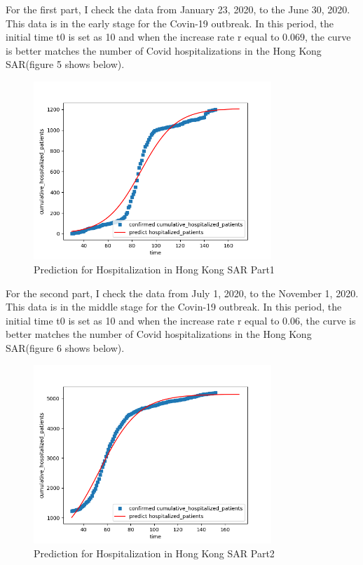 \documentclass[12pt]{article}
\begin{document}
	For the first part, I check the data from January 23, 2020, to the June 30, 2020. This data is in the early stage for the Covin-19 outbreak. In this period, the initial time t0 is set as 10 and when the increase rate r equal to 0.069, the curve is better matches the number of Covid hospitalizations in the Hong Kong SAR(figure 5 shows below).
	\clearpage
	\begin{figure}[h]
		\centering
		\includegraphics[width=0.8\textwidth]{Figure5.png}
		\caption{Prediction for Hospitalization in Hong Kong SAR Part1}
	\end{figure}

	For the second part, I check the data from July 1, 2020, to the November 1, 2020. This data is in the middle stage for the Covin-19 outbreak. In this period, the initial time t0 is set as 10 and when the increase rate r equal to 0.06, the curve is better matches the number of Covid hospitalizations in the Hong Kong SAR(figure 6 shows below).
	\clearpage
	\begin{figure}[h]
		\centering
		\includegraphics[width=0.8\textwidth]{Figure6.png}
		\caption{Prediction for Hospitalization in Hong Kong SAR Part2}
	\end{figure}
	
\end{document}
